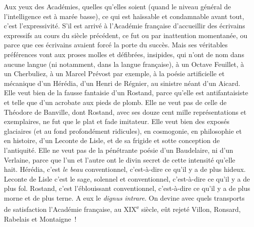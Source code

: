 \documentclass[french,twoside]{book} %
\begin{document}
Aux yeux des Académies, quelles qu’elles soient (quand le niveau général de l’intelligence est à marée basse), ce qui est haïssable et condamnable avant tout, c’est l’expressivité. S’il est arrivé à l’Académie française d’accueillir des écrivains expressifs au cours du siècle précédent, ce fut ou par inattention momentanée, ou parce que ces écrivains avaient forcé la porte du succès. Mais ses véritables préférences vont aux proses molles et défibrées, insipides, qui n’ont de nom dans aucune langue (ni notamment, dans la langue française), à un Octave Feuillet, à un Cherbuliez, à un Marcel Prévost par exemple, à la poésie artificielle et mécanique d’un Hérédia, d’un Henri de Régnier, au sinistre néant d’un Aicard. Elle veut bien de la fausse fantaisie d’un Rostand, parce qu’elle est antifantaisiste et telle que d’un acrobate aux pieds de plomb. Elle ne veut pas de celle de Théodore de Banville, dont Rostand, avec ses douze cent mille représentations et exemplaires, ne fut que le plat et fade imitateur. Elle veut bien des exposés glaciaires (et au fond profondément ridicules), en cosmogonie, en philosophie et en histoire, d’un Leconte de Lisle, et de sa frigide et sotte conception de l’antiquité. Elle ne veut pas de la pénétrante poésie d’un Baudelaire, ni d’un Verlaine, parce que l’un et l’autre ont le divin secret de cette intensité qu’elle hait. Hérédia, c’est {\itshape le beau} conventionnel, c’est-à-dire ce qu’il y a de plus hideux. Leconte de Lisle c’est le sage, solennel et conventionnel, c’est-à-dire ce qu’il y a de plus fol. Rostand, c’est l’éblouissant conventionnel, c’est-à-dire ce qu’il y a de plus morne et de plus terne. A eux le {\itshape dignus intrare}. On devine avec quels transports de satisfaction l’Académie française, au XIX\textsuperscript{e} siècle, eût rejeté Villon, Ronsard, Rabelais et Montaigne !\par
\end{document}
